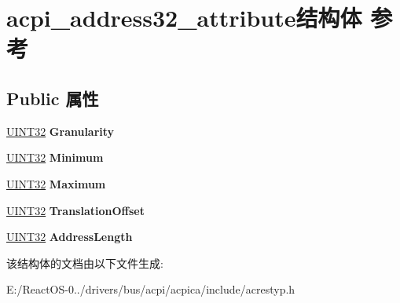 \hypertarget{structacpi__address32__attribute}{}\section{acpi\+\_\+address32\+\_\+attribute结构体 参考}
\label{structacpi__address32__attribute}
\subsection*{Public 属性}
\begin{DoxyCompactItemize}
\item 
\mbox{\label{structacpi__address32__attribute_a2a65ab07f28b4c885373acdea227d1ea}} 
\hyperlink{_processor_bind_8h_ae1e6edbbc26d6fbc71a90190d0266018}{U\+I\+N\+T32} {\bfseries Granularity}
\item 
\mbox{\label{structacpi__address32__attribute_aae1cbcb9cdfe74bebd936c160025c067}} 
\hyperlink{_processor_bind_8h_ae1e6edbbc26d6fbc71a90190d0266018}{U\+I\+N\+T32} {\bfseries Minimum}
\item 
\mbox{\label{structacpi__address32__attribute_ab64c0fbd79e6a594c1e1c9652d1ea145}} 
\hyperlink{_processor_bind_8h_ae1e6edbbc26d6fbc71a90190d0266018}{U\+I\+N\+T32} {\bfseries Maximum}
\item 
\mbox{\label{structacpi__address32__attribute_a0261991ab98b617c94a1b9ef56341bb4}} 
\hyperlink{_processor_bind_8h_ae1e6edbbc26d6fbc71a90190d0266018}{U\+I\+N\+T32} {\bfseries Translation\+Offset}
\item 
\mbox{\label{structacpi__address32__attribute_a43f4e558a5548f455614706b602b3fba}} 
\hyperlink{_processor_bind_8h_ae1e6edbbc26d6fbc71a90190d0266018}{U\+I\+N\+T32} {\bfseries Address\+Length}
\end{DoxyCompactItemize}


该结构体的文档由以下文件生成\+:\begin{DoxyCompactItemize}
\item 
E\+:/\+React\+O\+S-\/0../drivers/bus/acpi/acpica/include/acrestyp.\+h\end{DoxyCompactItemize}
